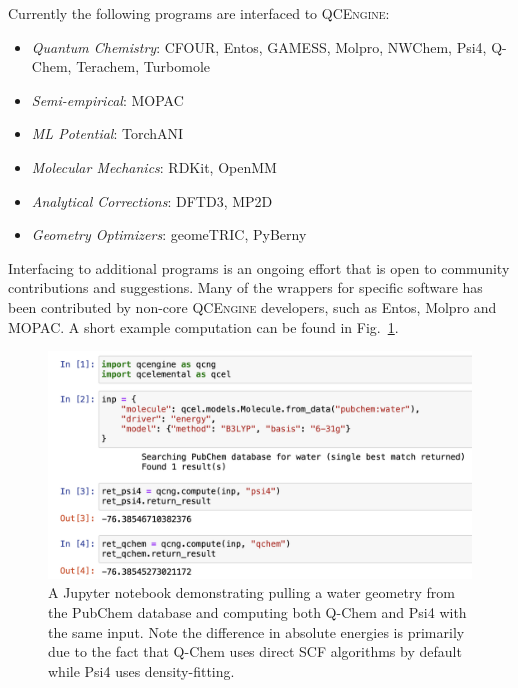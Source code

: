\documentclass[journal=jctcce,manuscript=article]{achemso}
\newcommand{\qcngN}{QCEngine}
\newcommand{\qcng}{{\textsc{\qcngN}}\xspace}%
\begin{document}
Currently the following programs are interfaced to \qcng:

\begin{itemize}
     \item {\it Quantum Chemistry}:
     CFOUR,\cite{WEB19:cfour}
     Entos,\cite{Manby:2019:entos} 
     GAMESS,\cite{GAMESS:2005}
     Molpro,\cite{WEB20:molpro,MOLPRO-WIREs}
     NWChem,\cite{Valiev:2010:1477}
     Psi4,\cite{Parrish:2017:3185}
     Q-Chem,\cite{Shao:2015:184}
     Terachem,\cite{Ufimtsev:2009:2619}
     Turbomole\cite{Furche:2014:91}
     \item {\it Semi-empirical}:
     MOPAC\cite{WEB20:mopac}
     \item {\it ML Potential}:
     TorchANI\cite{GH20:torchani, Smith:2017:3192}
     \item {\it Molecular Mechanics}:
     RDKit,\cite{GH20:rdkit}
     OpenMM\cite{Eastman:2017:1}
     \item {\it Analytical Corrections}:
     DFTD3,\cite{GH20:dftd3, Grimme:2010:154104}
     MP2D\cite{GH20:mp2d, Rezac:2018:4711}
     \item {\it Geometry Optimizers}:
     geomeTRIC,\cite{GH20:geometric, Wang:2016:214108}
     PyBerny\cite{GH20:pyberny}
\end{itemize}

Interfacing to additional programs is an ongoing effort that is open to community contributions and suggestions.
Many of the wrappers for specific software has been contributed by non-core \qcng developers, such as Entos, Molpro and MOPAC.
A short example computation can be found in Fig.~\ref{fig:qcengine}.

\begin{figure}[H]
    \centering
    \includegraphics[width=\columnwidth]{./images/QCEngineImage.png}
    \caption{A Jupyter notebook demonstrating pulling a water geometry from the PubChem database\cite{10.1093/nar/gky1033} and computing both Q-Chem and Psi4 with the same input. Note the difference in absolute energies is primarily due to the fact that Q-Chem uses direct SCF algorithms by default while Psi4 uses density-fitting.}
    \label{fig:qcengine}
\end{figure}
\end{document}
